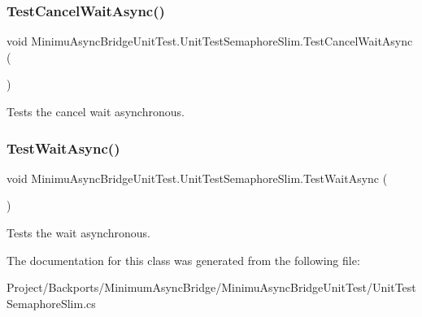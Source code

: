 \subsubsection{\texorpdfstring{Test\+Cancel\+Wait\+Async()}{TestCancelWaitAsync()}}
{\footnotesize\ttfamily void Minimu\+Async\+Bridge\+Unit\+Test.\+Unit\+Test\+Semaphore\+Slim.\+Test\+Cancel\+Wait\+Async (\begin{DoxyParamCaption}{ }\end{DoxyParamCaption})\hspace{0.3cm}{\ttfamily [inline]}}



Tests the cancel wait asynchronous. 

\mbox{\label{class_minimu_async_bridge_unit_test_1_1_unit_test_semaphore_slim_a4619e0dce995d83279ad8f057740af95}} 
\subsubsection{\texorpdfstring{Test\+Wait\+Async()}{TestWaitAsync()}}
{\footnotesize\ttfamily void Minimu\+Async\+Bridge\+Unit\+Test.\+Unit\+Test\+Semaphore\+Slim.\+Test\+Wait\+Async (\begin{DoxyParamCaption}{ }\end{DoxyParamCaption})\hspace{0.3cm}{\ttfamily [inline]}}



Tests the wait asynchronous. 



The documentation for this class was generated from the following file\+:\begin{DoxyCompactItemize}
\item 
Project/\+Backports/\+Minimum\+Async\+Bridge/\+Minimu\+Async\+Bridge\+Unit\+Test/Unit\+Test\+Semaphore\+Slim.\+cs\end{DoxyCompactItemize}
